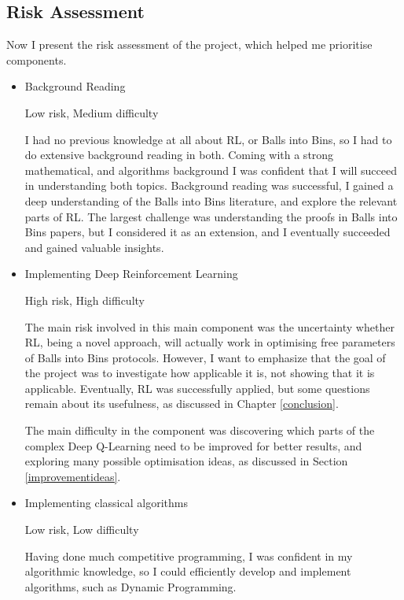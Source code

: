 \subsection{Risk Assessment}

Now I present the risk assessment of the project, which helped me prioritise components.

\begin{itemize}
    \item Background Reading
    
    Low risk, Medium difficulty 
    
    I had no previous knowledge at all about RL, or Balls into Bins, so I had to do extensive background reading in both. Coming with a strong mathematical, and algorithms background I was confident that I will succeed in understanding both topics. Background reading was successful, I gained a deep understanding of the Balls into Bins literature, and explore the relevant parts of RL. The largest challenge was understanding the proofs in Balls into Bins papers, but I considered it as an extension, and I eventually succeeded and gained valuable insights.
    \item Implementing Deep Reinforcement Learning
    
    High risk, High difficulty
    
    The main risk involved in this main component was the uncertainty whether RL, being a novel approach, will actually work in optimising free parameters of Balls into Bins protocols. However, I want to emphasize that the goal of the project was to investigate how applicable it is, not showing that it is applicable. Eventually, RL was successfully applied, but some questions remain about its usefulness, as discussed in Chapter \ref{conclusion}.
    
    
    The main difficulty in the component was discovering which parts of the complex Deep Q-Learning need to be improved for better results, and exploring many possible optimisation ideas, as discussed in Section \ref{improvementideas}.
    
    \item Implementing classical algorithms
    
    Low risk, Low difficulty
    
    Having done much competitive programming, I was confident in my algorithmic knowledge, so I could efficiently develop and implement algorithms, such as Dynamic Programming.
    

\end{itemize}
